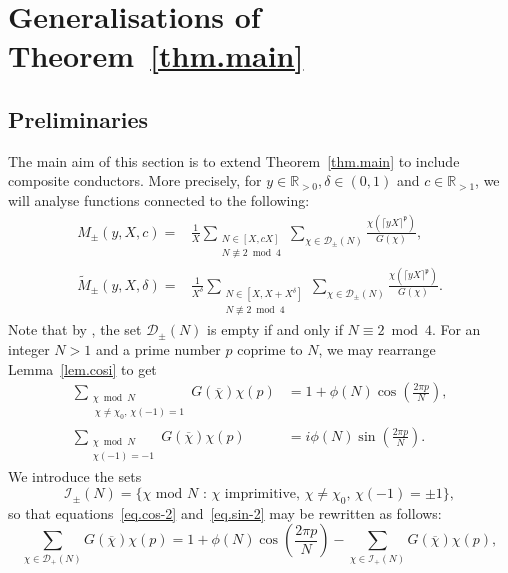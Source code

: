 \documentclass{amsart}
\theoremstyle{definition}
\newcommand{\prceil}{\rceil^{\mathfrak p}}
\numberwithin{equation}{section}
\begin{document}
\section{Generalisations of Theorem~\ref{thm.main}}\label{s:generalconductors}

\subsection{Preliminaries}
The main aim of this section is to extend Theorem~\ref{thm.main} to include composite conductors. 
More precisely, for $y\in\mathbb{R}_{>0}, \delta\in(0,1)$ and $c \in \mathbb{R}_{>1}$, we will analyse functions connected to the following:
\begin{align}
M_{\pm}(y,X, c)=&\frac{1}{X}\sum_{\substack{N \in[X, cX] \\ N \not\equiv 2 \bmod 4}} \sum_{\chi \in \mathcal{D}_\pm(N)} \frac{\chi(\lceil yX \prceil)}{G(\chi)},\label{eq.Mpm}\\
\widetilde{M}_{\pm}(y,X,\delta)=&\frac{1}{X^\delta}\sum_{\substack{N \in[X, X+X^\delta] \\ N \not\equiv 2 \bmod 4}} \sum_{\chi \in \mathcal{D}_\pm(N)} \frac{\chi(\lceil yX \prceil)}{G(\chi)}. 
\end{align}
Note that by \cite[equation~(3.7)]{IK}, the set $\mathcal{D}_\pm(N)$ is empty if and only if $N \equiv 2 \bmod 4$. 
For an integer $N>1$ and a prime number $p$ coprime to $N$, we may rearrange Lemma~\ref{lem.cosi} to get
\begin{align}
\sum_{\substack{\chi \bmod N \\ \ \chi \neq \chi_0, \, \chi(-1) = 1}} G(\overline{\chi}) \chi(p)&=1+\phi(N)\cos \left(\frac{2 \pi p}N \right), \label{eq.cos-2}\\
\sum_{\substack{\chi \bmod N \\ \chi(-1) = -1}} G(\overline{\chi}) \chi(p)&=i\phi(N)\sin\left(\frac{2 \pi p}{N} \right). \label{eq.sin-2}
\end{align}
We introduce the sets
\begin{equation}
\mathcal{I}_\pm(N) = \{\text{$\chi$ mod $N$ : $\chi$ imprimitive, $\chi \neq \chi_0$, $\chi(-1) = \pm 1$} \},
\end{equation}
so that equations~\eqref{eq.cos-2} and~\eqref{eq.sin-2} may be rewritten as follows:
\begin{equation}\label{eq.imprim-cos}
\sum_{\chi \in \mathcal D_+(N)} G(\overline{\chi}) \chi(p)
=1+ \phi(N)\cos \left (
\frac{2 \pi p} N \right )- \sum_{\chi \in \mathcal{I}_+(N)} G(\overline{\chi}) \chi(p),
\end{equation}
\end{document}
